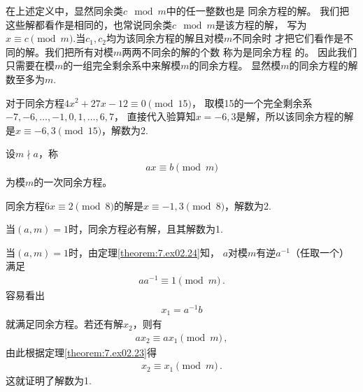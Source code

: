 在上述定义中，显然同余类$c\mod{m}$中的任一整数也是
同余方程的解。
我们把这些解都看作是相同的，也常说同余类$c\mod{m}$是该方程的解，
写为$x\equiv c\pmod{m}$.当$c_1,c_2$均为该同余方程的解且对模$m$不同余时
才把它们看作是不同的解。我们把所有对模$m$两两不同余的解的个数
称为是同余方程
的。
因此我们只需要在模$m$的一组完全剩余系中来解模$m$的同余方程。
显然模$m$的同余方程的解数至多为$m$.
\begin{example}
    对于同余方程$4x^2+27x-12\equiv0\pmod{15}$，
    取模15的一个完全剩余系$-7,-6,\ldots,-1,0,1,\ldots,6,7$，
    直接代入验算知$x=-6,3$是解，所以该同余方程的解
    是$x\equiv -6,3\pmod{15}$，解数为2.
\end{example}
\begin{definition}
    设$m\nmid a$，称
    \begin{align}\label{eq:7.ex02.linearcongruence}
        ax\equiv b\pmod{m}
    \end{align}
    为模$m$的{\sffamily 一次同余方程}。
\end{definition}
\begin{example}
    同余方程$6x\equiv2\pmod{8}$的解是$x\equiv-1,3\pmod{8}$，解数为2.
\end{example}
\begin{theorem}\label{theorem:7.ex02.29}
    当$(a,m)=1$时，同余方程必有解，且其解数为1.
\end{theorem}
\begin{prove}
    当$(a,m)=1$时，由定理\ref{theorem:7.ex02.24}知，
    $a$对模$m$有逆$a^{-1}$（任取一个）满足
    \begin{align}
        aa^{-1}\equiv1\pmod{m}\, .
    \end{align}
    容易看出
    \begin{align}
        x_1=a^{-1}b
    \end{align}
    就满足同余方程。若还有解$x_2$，则有
    \begin{align}
        ax_2\equiv ax_1\pmod{m}\, ,
    \end{align}
    由此根据定理\ref{theorem:7.ex02.23}得
    \begin{align}
        x_2\equiv x_1\pmod{m}\, .
    \end{align}
    这就证明了解数为1.
\end{prove}
